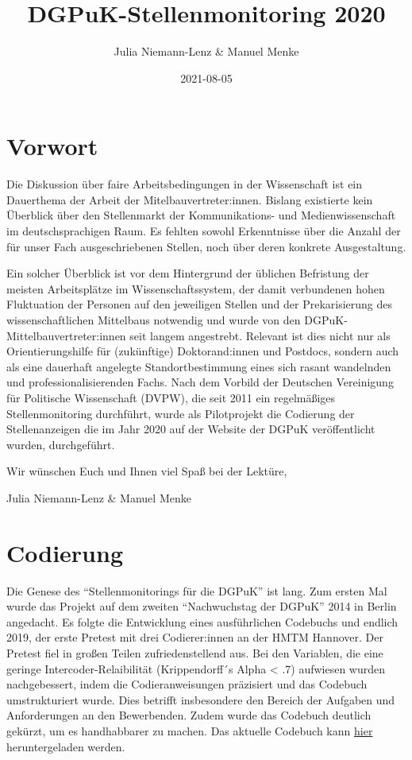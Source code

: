 \documentclass[
]{article}
\title{DGPuK-Stellenmonitoring 2020}
\author{Julia Niemann-Lenz \& Manuel Menke}
\date{2021-08-05}
\begin{document}
\maketitle

{
\setcounter{tocdepth}{2}
\tableofcontents
}
\newpage

\hypertarget{vorwort}{%
\section*{Vorwort}\label{vorwort}}

Die Diskussion über faire Arbeitsbedingungen in der Wissenschaft ist ein Dauerthema der Arbeit der Mitelbauvertreter:innen. Bislang existierte kein Überblick über den Stellenmarkt der Kommunikations- und Medienwissenschaft im deutschsprachigen Raum. Es fehlten sowohl Erkenntnisse über die Anzahl der für unser Fach ausgeschriebenen Stellen, noch über deren konkrete Ausgestaltung.

Ein solcher Überblick ist vor dem Hintergrund der üblichen Befristung der meisten Arbeitsplätze im Wissenschaftssystem, der damit verbundenen hohen Fluktuation der Personen auf den jeweiligen Stellen und der Prekarisierung des wissenschaftlichen Mittelbaus notwendig und wurde von den DGPuK-Mittelbauvertreter:innen seit langem angestrebt. Relevant ist dies nicht nur als Orientierungshilfe für (zukünftige) Doktorand:innen und Postdocs, sondern auch als eine dauerhaft angelegte Standortbestimmung eines sich rasant wandelnden und professionalisierenden Fachs.
Nach dem Vorbild der Deutschen Vereinigung für Politische Wissenschaft (DVPW), die seit 2011 ein regelmäßiges Stellenmonitoring durchführt, wurde als Pilotprojekt die Codierung der Stellenanzeigen die im Jahr 2020 auf der Website der DGPuK veröffentlicht wurden, durchgeführt.

Wir wünschen Euch und Ihnen viel Spaß bei der Lektüre,

Julia Niemann-Lenz \& Manuel Menke

\newpage

\hypertarget{codierung}{%
\section{Codierung}\label{codierung}}

Die Genese des ``Stellenmonitorings für die DGPuK'' ist lang. Zum ersten Mal wurde das Projekt auf dem zweiten ``Nachwuchstag der DGPuK'' 2014 in Berlin angedacht. Es folgte die Entwicklung eines ausführlichen Codebuchs und endlich 2019, der erste Pretest mit drei Codierer:innen an der HMTM Hannover. Der Pretest fiel in großen Teilen zufriedenstellend aus. Bei den Variablen, die eine geringe Intercoder-Relaibilität (Krippendorff´s Alpha \textless{} .7) aufwiesen wurden nachgebessert, indem die Codieranweisungen präzisiert und das Codebuch umstrukturiert wurde. Dies betrifft insbesondere den Bereich der Aufgaben und Anforderungen an den Bewerbenden. Zudem wurde das Codebuch deutlich gekürzt, um es handhabbarer zu machen. Das aktuelle Codebuch kann \href{data/Konzept_Stellenmonitoring_2021-08-05.pdf}{hier} heruntergeladen werden.
\end{document}
